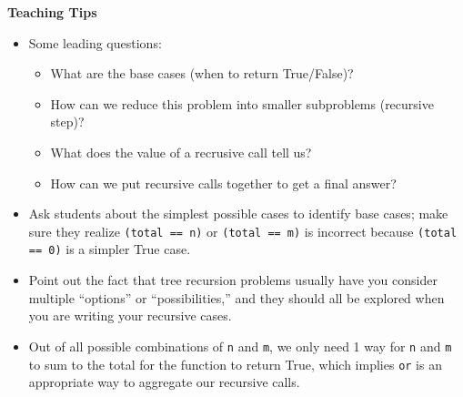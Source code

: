 \begin{blocksection}
\begin{guide}
\textbf{Teaching Tips}
\begin{itemize}
    \item Some leading questions:
    \begin{itemize}
        \item What are the base cases (when to return True/False)?
        \item How can we reduce this problem into smaller subproblems (recursive step)?
        \item What does the value of a recrusive call tell us?
        \item How can we put recursive calls together to get a final answer?
    \end{itemize}
    \item Ask students about the simplest possible cases to identify base cases; make sure they realize \lstinline{(total == n)} or \lstinline{(total == m)}  is incorrect because \lstinline{(total == 0)} is a simpler True case.
    \item Point out the fact that tree recursion problems usually have you consider multiple “options” or “possibilities,” and they should all be explored when you are writing your recursive cases.
    \item Out of all possible combinations of \lstinline{n} and \lstinline{m}, we only need 1 way for \lstinline{n} and \lstinline{m} to sum to the total for the function to return True, which implies \lstinline{or} is an appropriate way to aggregate our recursive calls.
\end{itemize}
\end{guide}
\end{blocksection}
